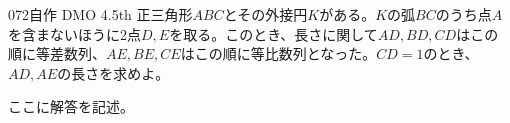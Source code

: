 \begin{thm}{072}{}{自作 DMO 4.5th}
 正三角形$ABC$とその外接円$K$がある。$K$の弧$BC$のうち点$A$を含まないほうに2点$D, E$を取る。このとき、長さに関して$AD, BD, CD$はこの順に等差数列、$AE, BE, CE$はこの順に等比数列となった。$CD=1$のとき、$AD, AE$の長さを求めよ。
\end{thm}

ここに解答を記述。